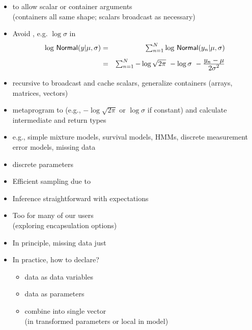 \documentclass[10pt]{report}
\newcommand{\sld}[1]{\newpage{\noindent\LARGE \ \ \
    \textcolor{MidnightBlue}{\bfseries #1}}\vspace*{4pt}}
\newcommand{\myemph}[1]{{\color{MidnightBlue}{\bfseries #1}}}
\begin{document}
\sld{Coding Probability Functions}
\begin{itemize}
\item \myemph{Vectorized} to allow scalar or container arguments
  \\ {\footnotesize (containers all same shape; scalars broadcast as necessary)}
\item Avoid \myemph{repeated computations}, e.g. $\log \sigma$ in
  \hspace*{-18pt}
  {\small
    \begin{eqnarray*}
      \textstyle \log \, \mbox{\sf Normal}(y | \mu, \sigma)
      & = & \textstyle \sum_{n=1}^N \log \, \mbox{\sf Normal}(y_n | \mu,\sigma)
      \\[4pt]
      & = & \textstyle \sum_{n=1}^N  - \log \sqrt{2\pi} \ - \log \sigma \ -
      \frac{\textstyle y_n - \mu}{\textstyle 2\sigma^2}
    \end{eqnarray*}
  }
\item recursive \myemph{expression templates} to broadcast and cache scalars,
  generalize containers (arrays, matrices, vectors)
\item \myemph{traits} metaprogram to \myemph{drop constants} (e.g., $-\log
  \sqrt{2 \pi}$ or $\log \sigma$ if constant) 
  and calculate intermediate and return types
\end{itemize}

\sld{Models with Discrete Parameters}
\begin{itemize}
\item e.g., simple mixture models, survival models, HMMs,
  discrete measurement error models, missing data
\item \myemph{Marginalize out} discrete parameters
\item Efficient sampling due to \myemph{Rao-Blackwellization}
\item Inference straightforward with expectations
  \vspace*{12pt}
\item Too \myemph{difficult} for many of our users
  \\
  {\small (exploring encapsulation options)}
\end{itemize}

\sld{Models with Missing Data}
\begin{itemize}
\item In principle, missing data just \myemph{additional parameters}
\item In practice, how to declare? 
  \begin{itemize}
  \item \myemph{observed} data as data variables
  \item \myemph{missing} data as parameters
  \item combine into single vector 
    \\ {\footnotesize (in transformed parameters or local in model)}
  \end{itemize}
\end{itemize}
\end{document}
